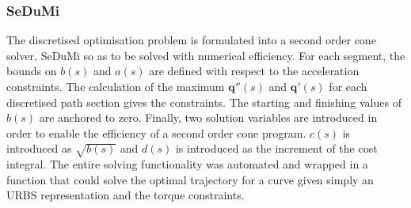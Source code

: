\subsubsection{SeDuMi}

The discretised optimisation problem is formulated into a second order cone solver, SeDuMi so as to be solved with numerical efficiency. For each segment, the bounds on $b(s)$ and $a(s)$ are defined with respect to the acceleration constraints. The calculation of the maximum $\textbf{q}''(s)$ and $\textbf{q}'(s)$ for each discretised path section gives the constraints. The starting and finishing values of $b(s)$ are anchored to zero. Finally, two solution variables are introduced in order to enable the efficiency of a second order cone program. $c(s)$ is introduced as $\sqrt{b(s)}$ and $d(s)$ is introduced as the increment of the cost integral.
The entire solving functionality was automated and wrapped in a function that could solve the optimal trajectory for a curve  given simply an URBS representation and the torque constraints.
